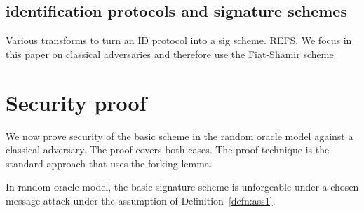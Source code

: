 \documentclass{llncs}
\begin{document}


\subsection{identification protocols and signature schemes}

Various transforms to turn an ID protocol into a sig scheme.
REFS.
We focus in this paper on classical adversaries and therefore use the Fiat-Shamir scheme.



\section{Security proof}
\label{sec:security-proof}

We now prove security of the basic scheme in the random oracle model against a classical adversary. The proof covers both cases.
The proof technique is the standard approach that uses the forking lemma.


\begin{theorem}\label{thm:security}
In random oracle model, the basic signature scheme is unforgeable under a chosen message attack under the assumption of Definition~\ref{defn:ass1}.
\end{theorem}
\end{document}
